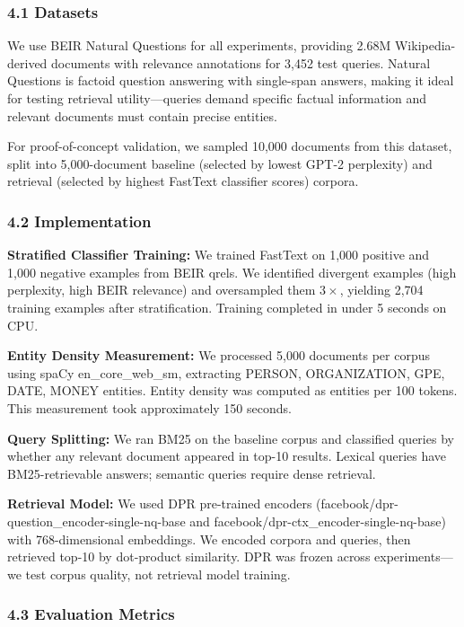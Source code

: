 
\subsubsection{4.1 Datasets}

We use BEIR Natural Questions for all experiments, providing 2.68M Wikipedia-derived documents with relevance annotations for 3,452 test queries. Natural Questions is factoid question answering with single-span answers, making it ideal for testing retrieval utility---queries demand specific factual information and relevant documents must contain precise entities.

For proof-of-concept validation, we sampled 10,000 documents from this dataset, split into 5,000-document baseline (selected by lowest GPT-2 perplexity) and retrieval (selected by highest FastText classifier scores) corpora.

\subsubsection{4.2 Implementation}

\textbf{Stratified Classifier Training:} We trained FastText on 1,000 positive and 1,000 negative examples from BEIR qrels. We identified divergent examples (high perplexity, high BEIR relevance) and oversampled them $3\times$, yielding 2,704 training examples after stratification. Training completed in under 5 seconds on CPU.

\textbf{Entity Density Measurement:} We processed 5,000 documents per corpus using spaCy en\_core\_web\_sm, extracting PERSON, ORGANIZATION, GPE, DATE, MONEY entities. Entity density was computed as entities per 100 tokens. This measurement took approximately 150 seconds.

\textbf{Query Splitting:} We ran BM25 on the baseline corpus and classified queries by whether any relevant document appeared in top-10 results. Lexical queries have BM25-retrievable answers; semantic queries require dense retrieval.

\textbf{Retrieval Model:} We used DPR pre-trained encoders (facebook/dpr-question\_encoder-single-nq-base and facebook/dpr-ctx\_encoder-single-nq-base) with 768-dimensional embeddings. We encoded corpora and queries, then retrieved top-10 by dot-product similarity. DPR was frozen across experiments---we test corpus quality, not retrieval model training.

\subsubsection{4.3 Evaluation Metrics}

